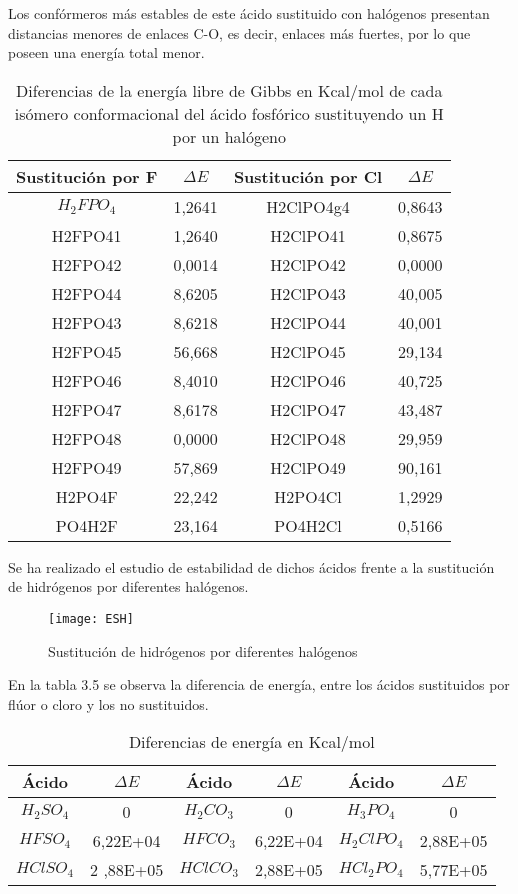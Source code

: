 Los confórmeros más estables de este ácido sustituido con halógenos presentan distancias menores de enlaces C-O, es decir, enlaces más fuertes, por lo que poseen una energía total menor.
\begin{table}[H]
\begin{center}
\begin{tabular}{|c|c|c|c|}
\hline
Sustitución por F & $\Delta E$ & Sustitución por Cl & $\Delta E$ \\ \hline
$H_2FPO_4$& 1,2641 & H2ClPO4g4 & 0,8643 \\ \hline
H2FPO41 & 1,2640 & H2ClPO41 & 0,8675 \\ \hline
H2FPO42 & 0,0014 & H2ClPO42 & 0,0000 \\ \hline
H2FPO44	& 8,6205 & H2ClPO43 & 40,005 \\ \hline
H2FPO43	& 8,6218 & H2ClPO44 & 40,001 \\ \hline
H2FPO45	& 56,668 & H2ClPO45 & 29,134 \\ \hline
H2FPO46	& 8,4010 & H2ClPO46 & 40,725 \\ \hline
H2FPO47	& 8,6178 & H2ClPO47 & 43,487 \\ \hline
H2FPO48	& 0,0000 & H2ClPO48 & 29,959 \\ \hline
H2FPO49	& 57,869 & H2ClPO49 & 90,161 \\ \hline
H2PO4F & 22,242 & H2PO4Cl & 1,2929 \\ \hline
PO4H2F & 23,164 & PO4H2Cl & 0,5166 \\ \hline
\end{tabular}
\caption{Diferencias de la energía libre de Gibbs en Kcal/mol de cada isómero conformacional del ácido fosfórico sustituyendo un H por un halógeno}
\end{center}
\end{table}

Se ha realizado el estudio de estabilidad de dichos ácidos frente a la sustitución de hidrógenos por diferentes halógenos.
\begin{figure}[h]
	\centering
	\texttt{[image: ESH]}
	\caption{Sustitución de hidrógenos por diferentes halógenos}
\end{figure}

En la tabla 3.5 se observa la diferencia de energía, entre los ácidos sustituidos por flúor o cloro y los no sustituidos.
\begin{table}
	\centering
	\begin{tabular}{|c|c|c|c|c|c|}
		\hline
		Ácido	& $\Delta E$ &	Ácido	& $\Delta E$ & Ácido & $\Delta E$\\ \hline
		$ H_2SO_4$	& 0	& $H_2CO_3$	 & 0 &	$H_3PO_4$	& 0 \\ \hline
		$HFSO_4$ &	6,22E+04	& $HFCO_3$	& 6,22E+04	& $H_2ClPO_4$	& 2,88E+05 \\ \hline
		$HClSO_4$ &	2 ,88E+05	& $HClCO_3$ &	2,88E+05	& $HCl_2PO_4$ &	5,77E+05 \\ \hline
	\end{tabular}
	\caption{Diferencias de energía en Kcal/mol}
\end{table}

